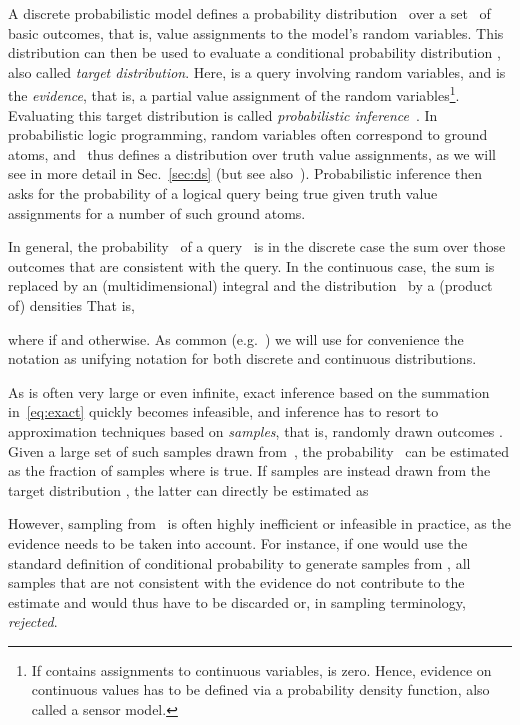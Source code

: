 \documentclass{tlp}
\begin{document}
A discrete probabilistic model defines a probability
distribution~ over a set~ of basic outcomes, that
is, value assignments to the model's random variables. This
distribution can then be used to evaluate a conditional probability
distribution , also called
\emph{target distribution}.  Here,  is a query involving random
variables, and  is the \emph{evidence}, that is, a partial value
assignment of the random variables\footnote{If  contains
  assignments to continuous variables,  is zero. Hence, evidence
  on continuous values has to be defined via a probability density
  function, also called a sensor model.}.  Evaluating this target
distribution is called \emph{probabilistic
  inference}~\cite{KollerFriedman09}. In probabilistic logic
programming, random variables often correspond to ground atoms,
and~ thus defines a distribution over truth value
assignments, as we will see in more detail in Sec.~\ref{sec:ds} (but
see also~). Probabilistic inference then asks for
the probability of a logical query being true given truth value
assignments for a number of such ground atoms.

In general, the probability~ of a query~ is in the
discrete case the sum over those outcomes  that are
consistent with the query.  In the continuous case, the sum is
replaced by an (multidimensional) integral and the
distribution~ by a (product of) densities
 That is,

where  if  and 
otherwise.  As common (e.g.~\cite{wasserman04allof}) we will use for
convenience the notation  as unifying notation for both
discrete and continuous distributions.

As  is often very large or even infinite, exact inference
based on the summation in~\eqref{eq:exact} quickly becomes infeasible,
and inference has to resort to approximation techniques based on
\emph{samples}, that is, randomly drawn outcomes . Given a large set of such samples  drawn
from~, the probability~ can be estimated as the
fraction of samples where  is true. If samples are instead drawn
from the target distribution , the latter can directly be
estimated as


However, sampling from~ is often highly inefficient or
infeasible in practice, as the evidence needs to be taken into
account. For instance, if one would use the standard definition of
conditional probability to generate samples from , all
samples that are not consistent with the evidence do not contribute to
the estimate and would thus have to be discarded or, in sampling
terminology, \emph{rejected}.
\end{document}
